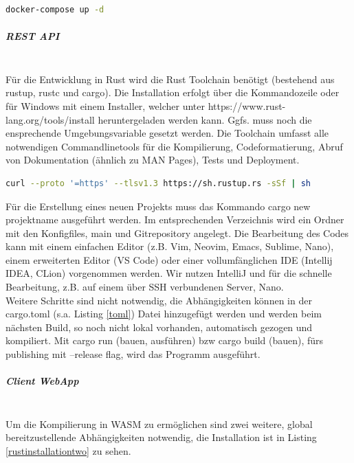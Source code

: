 \documentclass[notitlepage, hidelinks]{article}
\begin{document}
\begin{lstlisting}[language=bash,frame=single,caption=CLI Command zum Ausführen der docker-compose Datei. Das Kommando muss im Verzeichnis ausgeführt werden\, in dem die Datei liegt\, oder der Pfad der Datei über die flag --f spezifiziert werden,label=surrealdockerthree]
docker-compose up -d
\end{lstlisting}

\subparagraph{REST API} \mbox{} \\
Für die Entwicklung in Rust wird die Rust Toolchain benötigt (bestehend aus rustup, rustc und cargo). Die Installation erfolgt über die Kommandozeile oder für Windows mit einem Installer, welcher unter https://www.rust-lang.org/tools/install heruntergeladen werden kann. Ggfs. muss noch die ensprechende Umgebungsvariable gesetzt werden. Die Toolchain umfasst alle notwendigen Commandlinetools für die Kompilierung, Codeformatierung, Abruf von Dokumentation (ähnlich zu MAN Pages), Tests und Deployment. 

\begin{lstlisting}[language=bash,frame=single,caption=CLI Command zur Installation von Rust in Linux und macOS,label=rustinstallationone]
curl --proto '=https' --tlsv1.3 https://sh.rustup.rs -sSf | sh
\end{lstlisting}

Für die Erstellung eines neuen Projekts muss das Kommando cargo new projektname ausgeführt werden. Im entsprechenden Verzeichnis wird ein Ordner mit den Konfigfiles, main und Gitrepository angelegt. Die Bearbeitung des Codes kann mit einem einfachen Editor (z.B. Vim, Neovim, Emacs, Sublime, Nano), einem erweiterten Editor (VS Code) oder einer vollumfänglichen IDE (Intellij IDEA, CLion) vorgenommen werden. Wir nutzen IntelliJ und für die schnelle Bearbeitung, z.B. auf einem über SSH verbundenen Server, Nano. \\
Weitere Schritte sind nicht notwendig, die Abhängigkeiten können in der cargo.toml (s.a. Listing \ref{toml}) Datei hinzugefügt werden und werden beim nächsten Build, so noch nicht lokal vorhanden, automatisch gezogen und kompiliert. Mit cargo run (bauen, ausführen) bzw cargo build (bauen), fürs publishing mit --release flag, wird das Programm ausgeführt. 

\subparagraph{Client WebApp} \mbox{} \\
Um die Kompilierung in WASM zu ermöglichen sind zwei weitere, global bereitzustellende Abhängigkeiten notwendig, die Installation ist in Listing \ref{rustinstallationtwo} zu sehen.
\end{document}
